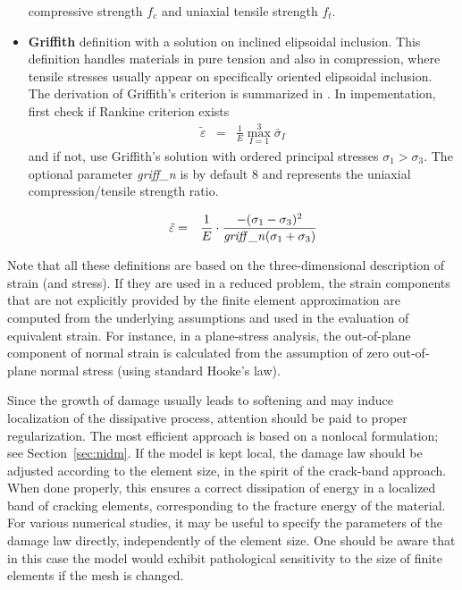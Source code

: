 \documentclass[a4paper]{article}
\newcommand{\param}[1]{{\it #1}}
\newcommand{\del}[2]{\mbox{$\displaystyle\frac{#1}{#2}$}}
\begin{document}
\begin{itemize}
compressive strength $f_c$ and uniaxial tensile strength $f_t$.
\item {\bf Griffith} definition with a solution on inclined elipsoidal inclusion. This definition
handles materials in pure tension and also in compression, where
tensile stresses usually appear on specifically oriented elipsoidal inclusion.
The derivation of Griffith's criterion is summarized in \cite{Hoek}.
In impementation, 
first check if Rankine criterion exists
\begin{eqnarray}
\label{griffith1}
\tilde\varepsilon&=&{\del{1}{E}}\max_{I=1}^{3}\bar{\sigma}_I
\end{eqnarray}
and if not, 
use Griffith's solution with ordered principal stresses $\sigma_1>\sigma_3$.
The optional parameter \param{griff\_n} is by default 8 and represents the uniaxial compression/tensile strength ratio.

\begin{eqnarray}
\label{griffith2}
\tilde\varepsilon&=&{\del{1}{E}}\cdot{\del{-(\sigma_1-\sigma_3)^2}{\param{griff\_n}(\sigma_1+\sigma_3)}}
\end{eqnarray}
\end{itemize}

Note that all these definitions are based on the three-dimensional
description of strain (and stress). If they are used in a reduced
problem, the strain components that are not explicitly provided by
the finite element approximation are computed from the underlying 
assumptions and used in the evaluation of equivalent strain.
For instance, in a plane-stress analysis, the out-of-plane component
of normal strain is calculated from the assumption of zero
out-of-plane normal stress (using standard Hooke's law).

Since the growth of damage usually leads to softening and may induce
localization of the dissipative process, attention should be paid
to proper regularization. The most efficient approach is based on
a nonlocal formulation; see Section~\ref{sec:nidm}. 
If the model is kept local, the damage law
should be adjusted according to the element size, in the spirit
of the crack-band approach. When done properly, this ensures
a correct dissipation of energy in a localized band of cracking
elements, corresponding to the fracture energy of the material.
For various numerical studies, it may be useful to specify the
parameters of the damage law directly, independently of the element size.
One should be aware that in this case the model would exhibit
pathological sensitivity to the size of finite elements if the mesh
is changed. 
\end{document}
